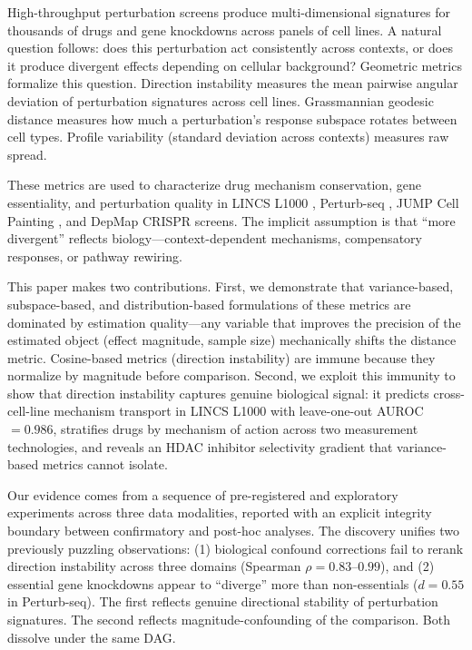 \documentclass[11pt]{article}
\begin{document}
High-throughput perturbation screens produce multi-dimensional signatures
for thousands of drugs and gene knockdowns across panels of cell lines.
A natural question follows: does this perturbation act consistently
across contexts, or does it produce divergent effects depending on
cellular background? Geometric metrics formalize this question.
Direction instability measures the mean pairwise angular deviation of
perturbation signatures across cell lines. Grassmannian geodesic
distance measures how much a perturbation's response subspace rotates
between cell types. Profile variability (standard deviation across
contexts) measures raw spread.

These metrics are used to characterize drug mechanism conservation, gene
essentiality, and perturbation quality in LINCS L1000
\citep{subramanian2017next}, Perturb-seq \citep{replogle2022mapping},
JUMP Cell Painting \citep{chandrasekaran2023jump}, and DepMap CRISPR
screens. The implicit assumption is that ``more divergent'' reflects
biology---context-dependent mechanisms, compensatory responses, or
pathway rewiring.

This paper makes two contributions. First, we demonstrate that
variance-based, subspace-based, and distribution-based formulations of
these metrics are dominated by estimation quality---any variable that
improves the precision of the estimated object (effect magnitude, sample
size) mechanically shifts the distance metric. Cosine-based metrics
(direction instability) are immune because they normalize by magnitude
before comparison. Second, we exploit this immunity to show that
direction instability captures genuine biological signal: it predicts
cross-cell-line mechanism transport in LINCS L1000 with leave-one-out
AUROC $= 0.986$, stratifies drugs by mechanism of action across two
measurement technologies, and reveals an HDAC inhibitor selectivity
gradient that variance-based metrics cannot isolate.

Our evidence comes from a sequence of pre-registered and exploratory
experiments across three data modalities, reported with an explicit
integrity boundary between confirmatory and post-hoc analyses.
The discovery unifies two previously puzzling observations: (1)
biological confound corrections fail to rerank direction instability
across three domains (Spearman $\rho = 0.83$--$0.99$), and (2) essential
gene knockdowns appear to ``diverge'' more than non-essentials ($d =
0.55$ in Perturb-seq). The first reflects genuine directional stability
of perturbation signatures. The second reflects magnitude-confounding of
the comparison. Both dissolve under the same DAG.
\end{document}
